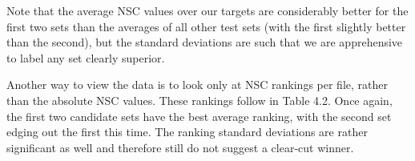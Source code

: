 \documentclass[a4paper,12pt]{report} 	%
\numberwithin{figure}{chapter}
\numberwithin{table}{chapter}
\numberwithin{equation}{chapter}
\begin{document}
\begin{flushleft}
Note that the average NSC values over our targets are considerably better for the first two sets than the averages of all other test sets (with the first slightly better than the second), but the standard deviations are such that we are apprehensive to label any set clearly superior.

Another way to view the data is to look only at NSC rankings per file, rather than the absolute NSC values. These rankings follow in Table 4.2.
Once again, the first two candidate sets have the best average ranking, with the second set edging out the first this time. The ranking standard deviations are rather significant as well and therefore still do not suggest a clear-cut winner. 


\end{flushleft}
\end{document}
